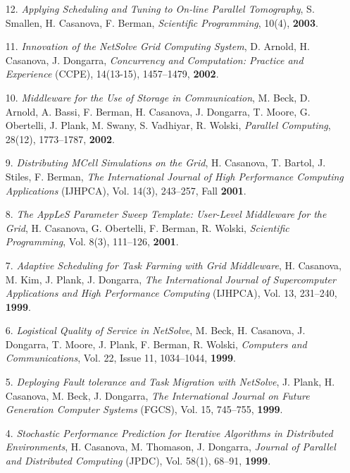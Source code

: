 \begin{enumerate}
\item[12.]
{\it Applying Scheduling and Tuning to On-line Parallel Tomography},
S. Smallen, H. Casanova, F. Berman, \emph{Scientific Programming},
10(4), {\bf 2003}. 

\item[11.]
{\it Innovation of the NetSolve Grid Computing System}, D. Arnold,
H. Casanova, J. Dongarra, \emph{Concurrency and Computation: Practice
and Experience} (CCPE), 14(13-15), 1457--1479, {\bf 2002}. 

\item[10.]
{\it Middleware for the Use of Storage in Communication}, M. Beck,
D. Arnold, A. Bassi, F. Berman, H. Casanova, J. Dongarra, T. Moore,
G. Obertelli, J. Plank, M. Swany, S. Vadhiyar, R. Wolski, \emph{Parallel
Computing}, 28(12), 1773--1787, {\bf 2002}.

\item[9.]
{\it Distributing MCell Simulations on the Grid}, H. Casanova, T. Bartol,
J. Stiles, F. Berman, \emph{The International Journal of High Performance
Computing Applications} (IJHPCA), Vol. 14(3), 243--257, Fall {\bf 2001}.

\item[8.]
{\it The AppLeS Parameter Sweep Template: User-Level Middleware for the
Grid}, H. Casanova, G. Obertelli, F. Berman, R. Wolski, \emph{Scientific
Programming}, Vol. 8(3), 111--126, {\bf 2001}.  

\item[7.]
{\it Adaptive Scheduling for Task Farming with Grid Middleware},
H. Casanova, M. Kim, J. Plank, J. Dongarra, \emph{The International
Journal of Supercomputer Applications and High Performance Computing}
(IJHPCA), Vol. 13, 231--240, {\bf 1999}.

\item[6.]
{\it Logistical Quality of Service in NetSolve}, M. Beck, H. Casanova,
J. Dongarra, T. Moore, J. Plank, F. Berman, R. Wolski, \emph{Computers
and Communications}, Vol. 22, Issue 11, 1034--1044, {\bf 1999}.

\item[5.]
{\it Deploying Fault tolerance and Task Migration with NetSolve},
J. Plank, H. Casanova, M. Beck, J. Dongarra, \emph{The International
Journal on Future Generation Computer Systems} (FGCS), Vol. 15, 745--755,
{\bf 1999}.

\item[4.]
{\it Stochastic Performance Prediction for Iterative Algorithms in
Distributed Environments}, H. Casanova, M. Thomason, J. Dongarra,
\emph{Journal of Parallel and Distributed Computing} (JPDC), Vol. 58(1),
68--91, {\bf 1999}.


\end{enumerate}

